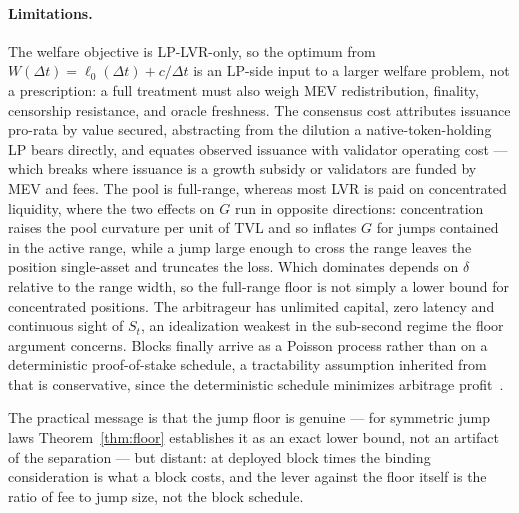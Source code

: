 \documentclass[runningheads]{llncs}
\newcommand{\dt}{\Delta t}
\newcommand{\1}{\mathbf{1}}
\newif\ifextended
\begin{document}
\paragraph{Limitations.}
The welfare objective is LP-LVR-only, so the optimum from $W(\dt) = \ell_0(\dt) + c/\dt$ is an LP-side input to a larger welfare problem, not a prescription: a full treatment must also weigh MEV redistribution, finality, censorship resistance, and oracle freshness. The consensus cost attributes issuance pro-rata by value secured, abstracting from the dilution a native-token-holding LP bears directly, and equates observed issuance with validator operating cost --- which breaks where issuance is a growth subsidy or validators are funded by MEV and fees. The pool is full-range, whereas most LVR is paid on concentrated liquidity, where the two effects on $G$ run in opposite directions: concentration raises the pool curvature per unit of TVL and so inflates $G$ for jumps contained in the active range, while a jump large enough to cross the range leaves the position single-asset and truncates the loss. Which dominates depends on $\delta$ relative to the range width, so the full-range floor is not simply a lower bound for concentrated positions. The arbitrageur has unlimited capital, zero latency and continuous sight of $S_t$, an idealization weakest in the sub-second regime the floor argument concerns. Blocks finally arrive as a Poisson process rather than on a deterministic proof-of-stake schedule, a tractability assumption inherited from~\cite{milionis2023automated} that is conservative, since the deterministic schedule minimizes arbitrage profit~\cite{nezlobin2025lvr}.

The practical message is that the jump floor is genuine --- for symmetric jump laws Theorem~\ref{thm:floor} establishes it as an exact lower bound, not an artifact of the separation --- but distant: at deployed block times the binding consideration is what a block costs, and the lever against the floor itself is the ratio of fee to jump size, not the block schedule.




\ifextended
\appendix

\fi
\end{document}
